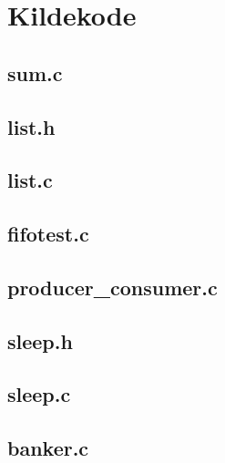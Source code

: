 \section{Kildekode}
\subsection{sum.c}


\subsection{list.h}


\subsection{list.c}


\subsection{fifotest.c}


\subsection{producer\_consumer.c}


\subsection{sleep.h}


\subsection{sleep.c}


\subsection{banker.c}

